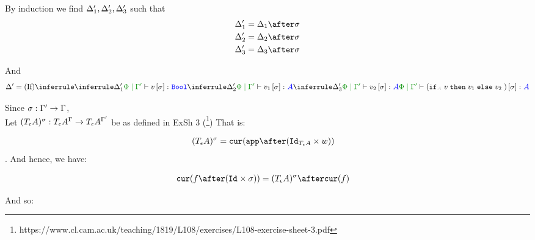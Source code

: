 \documentclass{report}
\begin{document}
By induction we find $\Delta_1', \Delta_2', \Delta_3'$ such that 
\begin{align*}
    \D_1' &= \D_1\after\si\\
    \D_2' &= \D_2\after\si\\
    \D_3' &= \D_3\after\si\\
\end{align*}

And
\begin{equation}
    \D' = \ntreeruleIII{If}{\treeruleI{\D_1'}{\etyperelation{\P}{\G'}{v\ssi}{\B}}}{\treeruleI{\D_2'}{\etyperelation{\P}{\G'}{v_1\ssi}{A}}}{\treeruleI{\D_3'}{\etyperelation{\P}{\G'}{v_2\ssi}{A}}}{\etyperelation{\P}{\G'}{(\pifthenelse{A}{v}{v_1}{v_2})\ssi}{A}}
\end{equation}

Since $\sigma: \Gamma' \rightarrow \Gamma$, \\
Let $(T_{\epsilon}{A})^{\sigma}: T_{\epsilon}{A}^{\Gamma}\rightarrow T_{\epsilon}{A}^{\Gamma'}$ be as defined in ExSh 3 (\footnote{https://www.cl.cam.ac.uk/teaching/1819/L108/exercises/L108-exercise-sheet-3.pdf})
That is:

\begin{align*}
    (\tea)^{\si} & = \cur{\app\after(\Id{\tea}\times w)}
\end{align*}.
And hence, we have:

\begin{align*}
    \cur{f\after(\Id{}\times \si)} & = (\tea)^{\si} \after\cur{f}
\end{align*}

And so:
\end{document}
